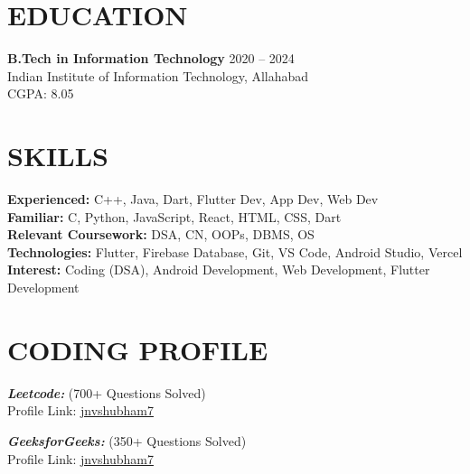 \documentclass[10pt, letterpaper]{article}
\begin{document}
\section{EDUCATION}

\textbf{B.Tech in Information Technology} \hfill 2020 -- 2024 \\
Indian Institute of Information Technology, Allahabad \\
CGPA: 8.05


\section{SKILLS}

\textbf{Experienced:} C++, Java, Dart, Flutter Dev, App Dev, Web Dev \\[0.5em]
\textbf{Familiar:} C, Python, JavaScript, React, HTML, CSS, Dart \\[0.5em]
\textbf{Relevant Coursework:} DSA, CN, OOPs, DBMS, OS \\[0.5em]
\textbf{Technologies:} Flutter, Firebase Database, Git, VS Code, Android Studio, Vercel \\[0.5em]
\textbf{Interest:} Coding (DSA), Android Development, Web Development, Flutter Development

\section{CODING PROFILE}

\textit{\textbf{Leetcode:}} (700+ Questions Solved) \\
Profile Link: \href{https://leetcode.com/jnvshubham7/}{jnvshubham7}

\vspace{1em}

\textit{\textbf{GeeksforGeeks:}} (350+ Questions Solved) \\
Profile Link: \href{https://auth.geeksforgeeks.org/user/jnvshubham7/profile}{jnvshubham7}
\end{document}
